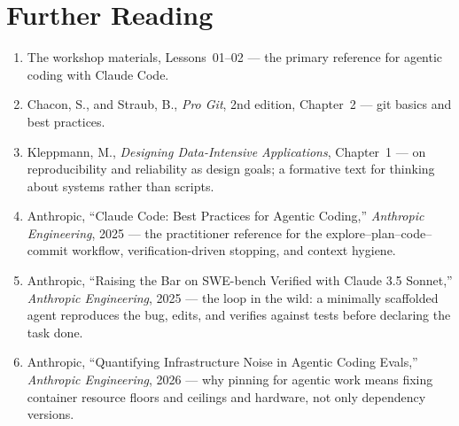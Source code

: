 \section*{Further Reading}

\begin{small}
\begin{enumerate}
\item The workshop materials,  Lessons~01--02 — the primary reference for agentic coding with Claude Code.
\item Chacon, S., and Straub, B., \emph{Pro Git}, 2nd edition, Chapter~2 — git basics and best practices.
\item Kleppmann, M., \emph{Designing Data-Intensive Applications}, Chapter~1 — on reproducibility and reliability as design goals; a formative text for thinking about systems rather than scripts.
\item Anthropic, ``Claude Code: Best Practices for Agentic Coding,'' \emph{Anthropic Engineering}, 2025 — the practitioner reference for the explore--plan--code--commit workflow, verification-driven stopping, and context hygiene.
\item Anthropic, ``Raising the Bar on SWE-bench Verified with Claude 3.5 Sonnet,'' \emph{Anthropic Engineering}, 2025 — the loop in the wild: a minimally scaffolded agent reproduces the bug, edits, and verifies against tests before declaring the task done.
\item Anthropic, ``Quantifying Infrastructure Noise in Agentic Coding Evals,'' \emph{Anthropic Engineering}, 2026 — why pinning for agentic work means fixing container resource floors and ceilings and hardware, not only dependency versions.
\end{enumerate}
\end{small}
